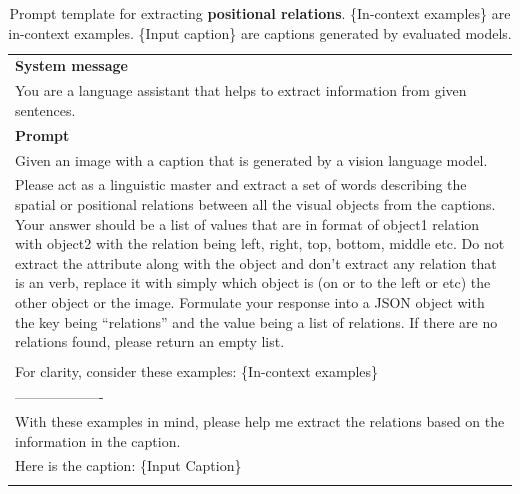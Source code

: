 \begin{table}[h!]\centering
\begin{minipage}{0.95\textwidth}  
\centering
\begin{tcolorbox} 
    \centering
    \small
    \begin{tabular}{p{}}
   { {\bf System message} } \\
You are a language assistant that helps to extract information from given sentences. \\
    \midrule
    {\bf Prompt}  \\
Given an image with a caption that is generated by a vision language model. \\
        Please act as a linguistic master and extract a set of words describing the spatial or positional relations between all the visual objects from the captions.
        Your answer should be a list of values that are in format of object1 relation with object2 with the relation being left, right, top, bottom, middle etc.
        Do not extract the attribute along with the object and don't extract any relation that is an verb, replace it with simply which object is (on or to the left or etc) the other object or the image. Formulate your response into a JSON object with the key being ``relations'' and the value being a list of relations. 
        If there are no relations found, please return an empty list. \\\\
        For clarity, consider these examples: \textcolor[rgb]{0,0.7,0}{ \{In-context examples\} } \\
------------------- \\
With these examples in mind, please help me extract the relations based on the information in the caption.\\
        Here is the caption: 
\textcolor[rgb]{0.8,0,0}{\{Input Caption\}} \\
\\

    \end{tabular}
\end{tcolorbox}
\caption{Prompt template for extracting \textbf{positional relations}. \textcolor[rgb]{0,0.7,0}{ \{In-context examples\} } are in-context examples. \textcolor[rgb]{0.8,0,0}{\{Input caption\}} are captions generated by evaluated models.}
    \label{tab:extraction_pos}
\end{minipage}
\end{table}


